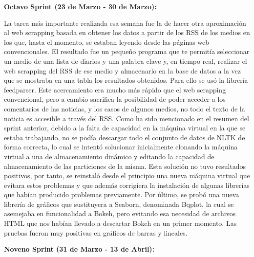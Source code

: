
\textbf{Octavo Sprint (23 de Marzo - 30 de Marzo):}

La tarea más importante realizada esa semana fue la de hacer otra aproximación al web scrapping basada en obtener los datos a partir de los RSS de los medios en los que, hasta el momento, se estaban leyendo desde las páginas web convencionales. El resultado fue un pequeño programa que te permitía seleccionar un medio de una lista de diarios y una palabra clave y, en tiempo real, realizar el web scrapping del RSS de ese medio y almacenarlo en la base de datos a la vez que se mostraba en una tabla los resultados obtenidos. Para ello se usó la librería feedparser.
Este acercamiento era mucho más rápido que el web scrapping convencional, pero a cambio sacrifica la posibilidad de poder acceder a los comentarios de las noticias, y los casos de algunos medios, no todo el texto de la noticia es accesible a través del RSS.
Como ha sido mencionado en el resumen del sprint anterior, debido a la falta de capacidad en la máquina virtual en la que se estaba trabajando, no se podía descargar todo el conjunto de datos de NLTK de forma correcta, lo cual se intentó solucionar inicialmente clonando la máquina virtual a una de almacenamiento dinámico y editando la capacidad de almacenamiento de las particiones de la misma. 
Esta solución no tuvo resultados positivos, por tanto, se reinstaló desde el principio una nueva máquina virtual que evitara estos problemas y que además corrigiera la instalación de algunas librerías que habían producido problemas previamente.
Por último, se probó una nueva librería de gráficos que sustituyera a Seaborn, denominada Bqplot, la cual se asemejaba en funcionalidad a Bokeh, pero evitando esa necesidad de archivos HTML que nos habían llevado a descartar Bokeh en un primer momento. Las pruebas fueron muy positivas en gráficos de barras y lineales.



\textbf{Noveno Sprint (31 de Marzo - 13 de Abril):}

